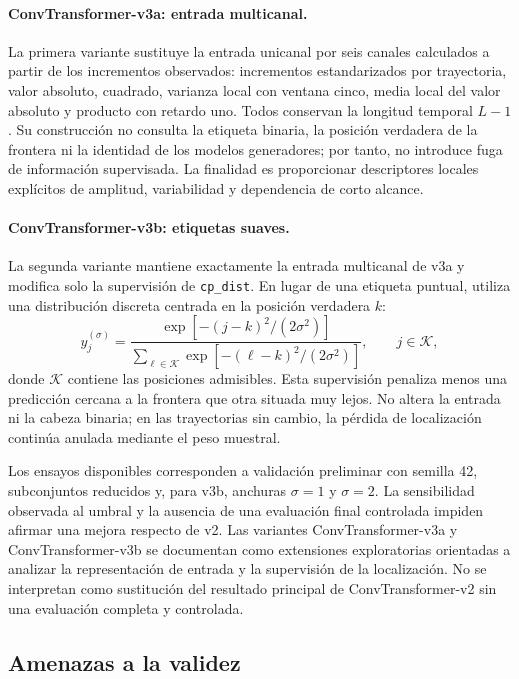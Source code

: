\documentclass[a4paper,12pt]{article}
\begin{document}
\paragraph{ConvTransformer-v3a: entrada multicanal.}
La primera variante sustituye la entrada unicanal por seis canales calculados a partir de los incrementos observados: incrementos estandarizados por trayectoria, valor absoluto, cuadrado, varianza local con ventana cinco, media local del valor absoluto y producto con retardo uno. Todos conservan la longitud temporal $L-1$. Su construcción no consulta la etiqueta binaria, la posición verdadera de la frontera ni la identidad de los modelos generadores; por tanto, no introduce fuga de información supervisada. La finalidad es proporcionar descriptores locales explícitos de amplitud, variabilidad y dependencia de corto alcance.

\paragraph{ConvTransformer-v3b: etiquetas suaves.}
La segunda variante mantiene exactamente la entrada multicanal de v3a y modifica solo la supervisión de \texttt{cp\_dist}. En lugar de una etiqueta puntual, utiliza una distribución discreta centrada en la posición verdadera $k$:
\begin{equation}
 y^{(\sigma)}_j=
 \frac{\exp\!\left[-(j-k)^2/(2\sigma^2)\right]}
 {\sum_{\ell\in\mathcal K}\exp\!\left[-(\ell-k)^2/(2\sigma^2)\right]},
 \qquad j\in\mathcal K,
 \label{eq:soft-labels-v3b}
\end{equation}
donde $\mathcal K$ contiene las posiciones admisibles. Esta supervisión penaliza menos una predicción cercana a la frontera que otra situada muy lejos. No altera la entrada ni la cabeza binaria; en las trayectorias sin cambio, la pérdida de localización continúa anulada mediante el peso muestral.

Los ensayos disponibles corresponden a validación preliminar con semilla 42, subconjuntos reducidos y, para v3b, anchuras $\sigma=1$ y $\sigma=2$. La sensibilidad observada al umbral y la ausencia de una evaluación final controlada impiden afirmar una mejora respecto de v2. Las variantes ConvTransformer-v3a y ConvTransformer-v3b se documentan como extensiones exploratorias orientadas a analizar la representación de entrada y la supervisión de la localización. No se interpretan como sustitución del resultado principal de ConvTransformer-v2 sin una evaluación completa y controlada.

\subsection{Amenazas a la validez}
\end{document}
